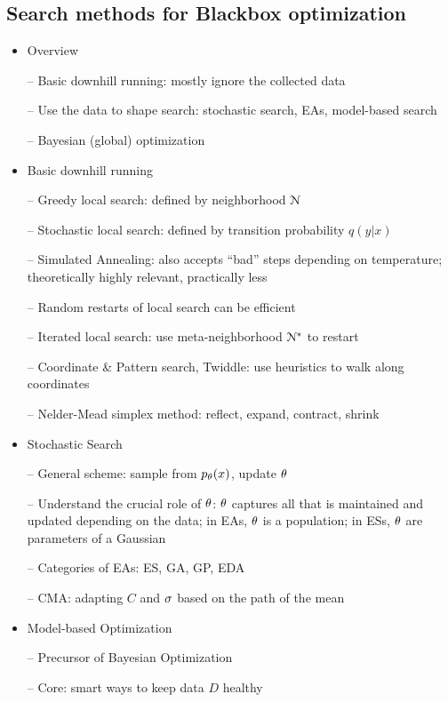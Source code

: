 
\subsection{Search methods for Blackbox optimization}

\begin{itemize}

\item Overview

-- Basic downhill running: mostly ignore the collected data

-- Use the data to shape search: stochastic search, EAs, model-based
search

-- Bayesian (global) optimization

\item Basic downhill running

-- Greedy local search: defined by neighborhood ${\cal N}$

-- Stochastic local search: defined by transition probability $q(y|x)$

-- Simulated Annealing: also accepts ``bad'' steps depending on
temperature; theoretically highly relevant, practically less

-- Random restarts of local search can be efficient

-- Iterated local search: use meta-neighborhood ${\cal N}^*$ to restart

-- Coordinate \& Pattern search, Twiddle: use heuristics to walk along
coordinates

-- Nelder-Mead simplex method: reflect, expand, contract, shrink

\item Stochastic Search

-- General scheme: sample from $p_\theta(x)$, update $\theta$

-- Understand the crucial role of $\theta$: $\theta$ captures all that is
maintained and updated depending on the data; in EAs, $\theta$ is a population;
in ESs, $\theta$ are parameters of a Gaussian

-- Categories of EAs: ES, GA, GP, EDA

-- CMA: adapting $C$ and $\sigma$ based on the path of the mean

\item Model-based Optimization

-- Precursor of Bayesian Optimization

-- Core: smart ways to keep data $D$ healthy

\end{itemize}

